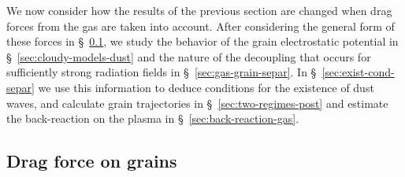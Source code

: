 
We now consider how the results of the previous section are changed
when drag forces from the gas are taken into account.  After
considering the general form of these forces in
\S~\ref{sec:drag-force-grains}, we study the behavior of the grain
electrostatic potential in \S~\ref{sec:cloudy-models-dust} and the
nature of the decoupling that occurs for sufficiently strong radiation
fields in \S~\ref{sec:gas-grain-separ}.  In
\S~\ref{sec:exist-cond-separ} we use this information to deduce
conditions for the existence of dust waves, and calculate grain
trajectories in \S~\ref{sec:two-regimes-post} and estimate the
back-reaction on the plasma in \S~\ref{sec:back-reaction-gas}.


\subsection{Drag force on grains}
\label{sec:drag-force-grains}

